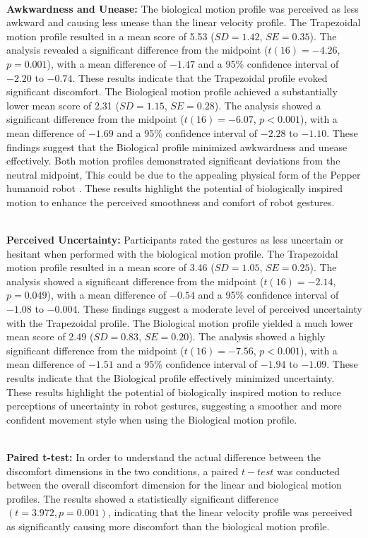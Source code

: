 \documentclass{CSSRforAfrica}
\begin{document}
~\\
\noindent \textbf{Awkwardness and Unease:}
The biological motion profile was perceived as less awkward and causing less unease than the linear velocity profile. 
The Trapezoidal motion profile resulted in a mean score of 5.53 ($SD = 1.42$, $SE = 0.35$). The analysis revealed a significant difference from the midpoint ($t(16) = -4.26$, $p = 0.001$), with a mean difference of $-1.47$ and a 95\% confidence interval of $-2.20$ to $-0.74$. These results indicate that the Trapezoidal profile evoked significant discomfort. 
The Biological motion profile achieved a substantially lower mean score of 2.31 ($SD = 1.15$, $SE = 0.28$). The analysis showed a significant difference from the midpoint ($t(16) = -6.07$, $p < 0.001$), with a mean difference of $-1.69$ and a 95\% confidence interval of $-2.28$ to $-1.10$. These findings suggest that the Biological profile minimized awkwardness and unease effectively.
Both motion profiles demonstrated significant deviations from the neutral midpoint, This could be due to the appealing physical form of the Pepper humanoid robot \cite{VernonSandini2024}. These results highlight the potential of biologically inspired motion to enhance the perceived smoothness and comfort of robot gestures.

~\\
\noindent \textbf{Perceived Uncertainty:}
Participants rated the gestures as less uncertain or hesitant when performed with the biological motion profile. 
The Trapezoidal motion profile resulted in a mean score of 3.46 ($SD = 1.05$, $SE = 0.25$). The analysis showed a significant difference from the midpoint ($t(16) = -2.14$, $p = 0.049$), with a mean difference of $-0.54$ and a 95\% confidence interval of $-1.08$ to $-0.004$. These findings suggest a moderate level of perceived uncertainty with the Trapezoidal profile.
The Biological motion profile yielded a much lower mean score of 2.49 ($SD = 0.83$, $SE = 0.20$). The analysis showed a highly significant difference from the midpoint ($t(16) = -7.56$, $p < 0.001$), with a mean difference of $-1.51$ and a 95\% confidence interval of $-1.94$ to $-1.09$. These results indicate that the Biological profile effectively minimized uncertainty.
These results highlight the potential of biologically inspired motion to reduce perceptions of uncertainty in robot gestures, suggesting a smoother and more confident movement style when using the Biological motion profile.

~\\
\noindent \textbf{Paired t-test:}
In order to understand the actual difference between the discomfort dimensions in the two conditions, a paired $t-test$ was conducted between the overall discomfort dimension for the linear and biological motion profiles. The results showed a statistically significant difference $(t = 3.972, p  = 0.001)$, indicating that the linear velocity profile was perceived as significantly causing more discomfort than the biological motion profile.
\end{document}
